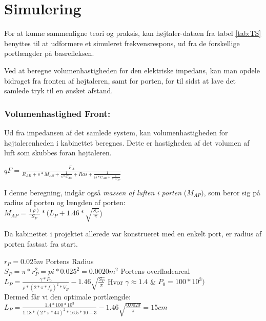 \chapter{Simulering}


For at kunne sammenligne teori og praksis, kan højtaler-dataen fra tabel \ref{tab:TS} benyttes til at udformere et simuleret frekvensrespons, ud fra de forskellige portlængder på basrefleksen. 

Ved at beregne volumenhastigheden for den elektriske impedans, kan man opdele bidraget fra fronten af højtaleren, samt for porten, for til sidst at lave det samlede tryk til en ønsket afstand. 


\subsection{Volumenhastighed Front:}
\label{sec:sim_calc}

Ud fra impedansen af det samlede system, kan volumenhastigheden for højtalerenheden i kabinettet beregnes. Dette er hastigheden af det volumen af luft som skubbes foran højtaleren. 

{\Large\(qF=\)}{\huge \(\frac{F_A}{R_{AE}+s*M_{AS}+\frac{1}{s*C_{AS}}+Ras+\frac{1}{(s*C_{AB}+\frac{1}{s*M_{AP}}}}\) }

I denne beregning, indgår også \textit{massen af luften i porten} ($M_{AP})$, som beror sig på radius af porten og længden af porten:\\

\(M_{AP}=\frac{(\rho)}{S_P}*(L_P+1.46*\sqrt{\frac{S_P}{\pi}}\))

Da kabinettet i projektet allerede var konstrueret med en enkelt port, er radius af porten fastsat fra start.

\(r_P=0.025 m\)		\hspace{6.2cm} Portens Radius\\
\(S_P=\pi*r_P^2=pi*0.025^2=0.0020 m^2\)		\hspace{2cm} Portens overfladeareal\\

\(L_P=\frac{\gamma*P_0}{\rho*(2*\pi*f_p)^2*V_{B}}-1.46\sqrt{\frac{S_P}{\pi}}\)			\hspace{3cm} Hvor $\gamma \approx 1.4$ \& $P_0=100*10^3)$\\

Dermed får vi den optimale portlængde:\\

\(L_P=\frac{1.4*100*10^3}{1.18*(2*\pi*44)^2*16.5*10-3}-1.46\sqrt{\frac{0.0020}{\pi}}=15cm\)


